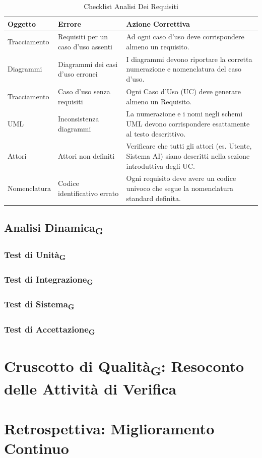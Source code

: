 \documentclass[11pt,a4paper]{article}
\begin{document}
\begin{table}[H]
    \centering
    \renewcommand{\arraystretch}{1.4}
    \begin{tabular}{|l|>{\raggedright\arraybackslash}p{}|>{\raggedright\arraybackslash}p{}|}
        \hline
        \textbf{Oggetto} & \textbf{Errore} & \textbf{Azione Correttiva} \\
        \hline
        Tracciamento & Requisiti per un caso d'uso assenti & Ad ogni caso d'uso deve corrispondere almeno un requisito. \\
        \hline
        Diagrammi & Diagrammi dei casi d'uso erronei & I diagrammi devono riportare la corretta numerazione e nomenclatura del caso d'uso. \\
        \hline
        Tracciamento & Caso d'uso senza requisiti & Ogni Caso d'Uso (UC) deve generare almeno un Requisito. \\
        \hline
        UML & Inconsistenza diagrammi & La numerazione e i nomi negli schemi UML devono corrispondere esattamente al testo descrittivo. \\
        \hline
        Attori & Attori non definiti & Verificare che tutti gli attori (es. Utente, Sistema AI) siano descritti nella sezione introduttiva degli UC. \\
        \hline
        Nomenclatura & Codice identificativo errato & Ogni requisito deve avere un codice univoco che segue la nomenclatura standard definita. \\
        \hline
    \end{tabular}
    \caption{Checklist Analisi Dei Requisiti}
\end{table}


\subsection{Analisi Dinamica\textsubscript{G}}
\subsubsection{Test di Unità\textsubscript{G}}

\subsubsection{Test di Integrazione\textsubscript{G}}

\subsubsection{Test di Sistema\textsubscript{G}}

\subsubsection{Test di Accettazione\textsubscript{G}}



\newpage
\section{Cruscotto di Qualità\textsubscript{G}: Resoconto delle Attività di Verifica}


\newpage
\section{Retrospettiva: Miglioramento Continuo}


\newpage
\end{document}
